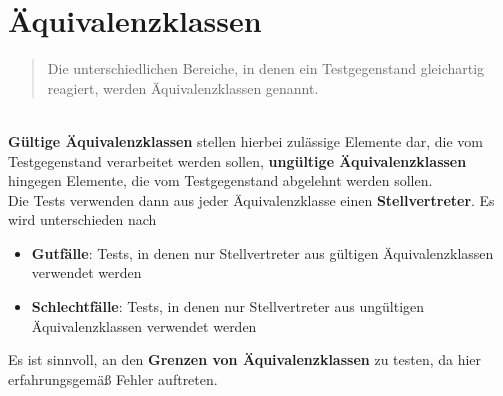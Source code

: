 \section{Äquivalenzklassen}


\begin{tcolorbox}[title=Äquivalenzklassen]
    \blockquote[{\cite[43]{Wed09c}}]{
        Die unterschiedlichen Bereiche, in denen ein Testgegenstand gleichartig reagiert, werden Äquivalenzklassen genannt.
    }\\
    \textbf{Gültige Äquivalenzklassen} stellen hierbei zulässige Elemente dar, die vom Testgegenstand verarbeitet werden sollen, \textbf{ungültige Äquivalenzklassen} hingegen Elemente, die vom Testgegenstand abgelehnt werden sollen.\\

    \noindent
    Die Tests verwenden dann aus jeder Äquivalenzklasse einen \textbf{Stellvertreter}.
    Es wird unterschieden nach

    \begin{itemize}
        \item \textbf{Gutfälle}: Tests, in denen nur Stellvertreter aus gültigen Äquivalenzklassen verwendet werden
        \item \textbf{Schlechtfälle}: Tests, in denen nur Stellvertreter aus ungültigen Äquivalenzklassen verwendet werden
    \end{itemize}

    Es ist sinnvoll, an den \textbf{Grenzen von Äquivalenzklassen} zu testen, da hier erfahrungsgemäß Fehler auftreten.

\end{tcolorbox}